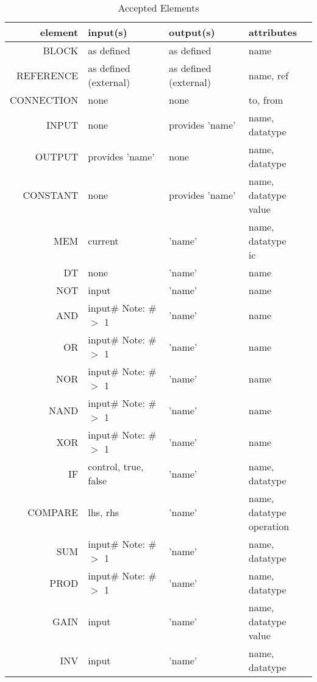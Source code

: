 \begin{longtable}[c]{ |r|l|l|l| } 
    \caption{Accepted Elements}
    \label{table:elem}
    \hline
    element & input(s) & output(s) & attributes \\ 
    \hline
    \hline
    BLOCK & as defined & as defined & name \\ 
    \hline
    REFERENCE & as defined (external) & as defined (external) & name, ref \\ 
    \hline
    CONNECTION & none & none & to, from \\
    \hline
    INPUT & none & provides 'name' & name, datatype \\ 
    \hline
    OUTPUT & provides 'name' & none & name, datatype \\ 
    \hline
    CONSTANT & none & provides 'name' & \specialcell{name, datatype \\ value} \\ 
    \hline
    \hline
    MEM & current & 'name' & \specialcell{name, datatype \\ ic} \\
    \hline
    DT & none & 'name' & name \\
    \hline
    NOT & input & 'name' & name \\
    \hline
    AND & \specialcell{input\# \\ Note: \# $>$ 1} & 'name' & name \\
    \hline
    OR & \specialcell{input\# \\ Note: \# $>$ 1} & 'name' & name \\
    \hline
    NOR & \specialcell{input\# \\ Note: \# $>$ 1} & 'name' & name \\
    \hline
    NAND & \specialcell{input\# \\ Note: \# $>$ 1} & 'name' & name \\
    \hline
    XOR & \specialcell{input\# \\ Note: \# $>$ 1} & 'name' & name \\
    \hline
    IF & control, true, false & 'name' & name, datatype \\
    \hline
    COMPARE & lhs, rhs  & 'name' & \specialcell{name, datatype \\ operation} \\
    \hline
    SUM & \specialcell{input\# \\ Note: \# $>$ 1} & 'name' & name, datatype \\
    \hline
    PROD & \specialcell{input\# \\ Note: \# $>$ 1} & 'name' & name, datatype \\
    \hline
    GAIN & input & 'name' & \specialcell{name, datatype \\ value} \\
    \hline
    INV & input & 'name' & name, datatype \\
    \hline
\end{longtable}
